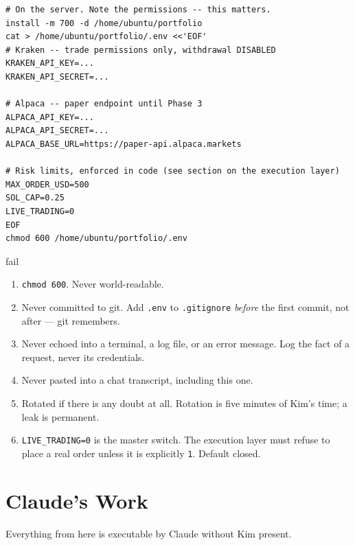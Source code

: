 \documentclass[11pt,a4paper]{article}
\begin{document}
\begin{codebox}
\begin{lstlisting}[style=shell]
# On the server. Note the permissions -- this matters.
install -m 700 -d /home/ubuntu/portfolio
cat > /home/ubuntu/portfolio/.env <<'EOF'
# Kraken -- trade permissions only, withdrawal DISABLED
KRAKEN_API_KEY=...
KRAKEN_API_SECRET=...

# Alpaca -- paper endpoint until Phase 3
ALPACA_API_KEY=...
ALPACA_API_SECRET=...
ALPACA_BASE_URL=https://paper-api.alpaca.markets

# Risk limits, enforced in code (see section on the execution layer)
MAX_ORDER_USD=500
SOL_CAP=0.25
LIVE_TRADING=0
EOF
chmod 600 /home/ubuntu/portfolio/.env
\end{lstlisting}
\end{codebox}

\begin{resultbox}{fail}
\begin{enumerate}[leftmargin=1.5em, topsep=2pt]
    \item \texttt{chmod 600}. Never world-readable.
    \item Never committed to git. Add \texttt{.env} to
          \texttt{.gitignore} \emph{before} the first commit, not after
          --- git remembers.
    \item Never echoed into a terminal, a log file, or an error
          message. Log the fact of a request, never its credentials.
    \item Never pasted into a chat transcript, including this one.
    \item Rotated if there is any doubt at all. Rotation is five
          minutes of Kim's time; a leak is permanent.
    \item \texttt{LIVE\_TRADING=0} is the master switch. The
          execution layer must refuse to place a real order unless it
          is explicitly \texttt{1}. Default closed.
\end{enumerate}
\end{resultbox}

\part{Claude's Work}

Everything from here is executable by Claude without Kim present.
\end{document}
